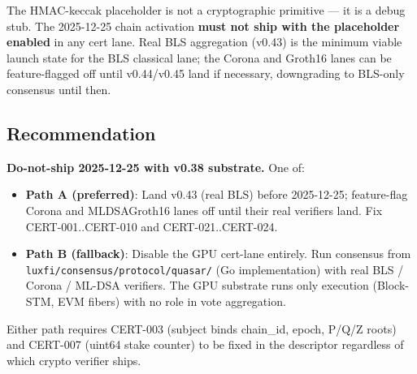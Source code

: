 \documentclass[
]{article}
\providecommand{\tightlist}{%
  \setlength{\itemsep}{0pt}\setlength{\parskip}{0pt}}
\begin{document}
The HMAC-keccak placeholder is not a cryptographic primitive --- it is a
debug stub. The 2025-12-25 chain activation \textbf{must not ship with
the placeholder enabled} in any cert lane. Real BLS aggregation (v0.43)
is the minimum viable launch state for the BLS classical lane; the
Corona and Groth16 lanes can be feature-flagged off until v0.44/v0.45
land if necessary, downgrading to BLS-only consensus until then.

\subsection{Recommendation}\label{recommendation}

\textbf{Do-not-ship 2025-12-25 with v0.38 substrate.} One of:

\begin{itemize}
\tightlist
\item
  \textbf{Path A (preferred)}: Land v0.43 (real BLS) before 2025-12-25;
  feature-flag Corona and MLDSAGroth16 lanes off until their real
  verifiers land. Fix CERT-001..CERT-010 and CERT-021..CERT-024.
\item
  \textbf{Path B (fallback)}: Disable the GPU cert-lane entirely. Run
  consensus from \texttt{luxfi/consensus/protocol/quasar/} (Go
  implementation) with real BLS / Corona / ML-DSA verifiers. The GPU
  substrate runs only execution (Block-STM, EVM fibers) with no role in
  vote aggregation.
\end{itemize}

Either path requires CERT-003 (subject binds chain\_id, epoch, P/Q/Z
roots) and CERT-007 (uint64 stake counter) to be fixed in the descriptor
regardless of which crypto verifier ships.
\end{document}
